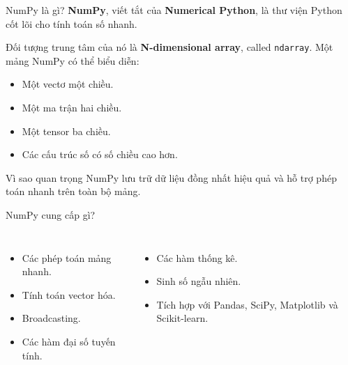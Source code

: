 \documentclass[aspectratio=169,11pt]{beamer}
\newcommand{\key}[1]{\textbf{\textcolor{AccentGreen}{#1}}}
\newcommand{\imageplaceholder}[2]{%
\begin{center}
  \fcolorbox{SoftGray}{gray!5}{%
  \begin{minipage}[c][0.55\textheight][c]{0.84\linewidth}
  \centering
  {\Large\textcolor{TitleBlue}{Image Placeholder}}\\\[1.0em]
  {\normalsize\textbf{#2}}\\\[1.2em]
  {\footnotesize Source path in Markdown:}\\\[0.35em]
  {\small\texttt{\detokenize{#1}}}
  \end{minipage}}
\end{center}
}
\begin{document}
\begin{frame}{NumPy là gì?}
\small
\key{NumPy}, viết tắt của \key{Numerical Python}, là thư viện Python cốt lõi cho tính toán số nhanh.
\vspace{0.4em}

Đối tượng trung tâm của nó là \key{N-dimensional array}, called \texttt{ndarray}. Một mảng NumPy có thể biểu diễn:
\begin{itemize}
  \item Một vectơ một chiều.
  \item Một ma trận hai chiều.
  \item Một tensor ba chiều.
  \item Các cấu trúc số có số chiều cao hơn.
\end{itemize}
\begin{block}{Vì sao quan trọng}
NumPy lưu trữ dữ liệu đồng nhất hiệu quả và hỗ trợ phép toán nhanh trên toàn bộ mảng.
\end{block}
\end{frame}

\begin{frame}{NumPy cung cấp gì?}
\small
\begin{columns}[T]
\begin{itemize}
  \item Các phép toán mảng nhanh.
  \item Tính toán vector hóa.
  \item Broadcasting.
  \item Các hàm đại số tuyến tính.
\end{itemize}
\begin{itemize}
  \item Các hàm thống kê.
  \item Sinh số ngẫu nhiên.
  \item Tích hợp với Pandas, SciPy, Matplotlib và Scikit-learn.
\end{itemize}
\end{columns}
\vspace{0.7em}
\end{frame}
\end{document}
